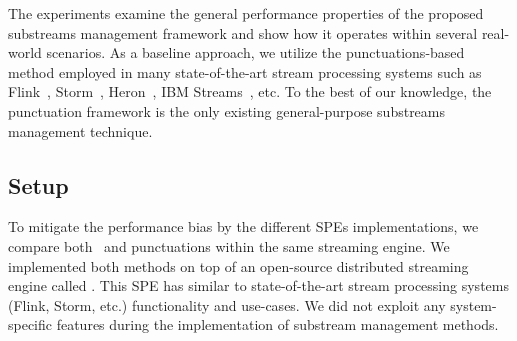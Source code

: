 
The experiments examine the general performance properties of the proposed substreams management framework and show how it operates within several real-world scenarios. As a baseline approach, we utilize the punctuations-based method employed in many state-of-the-art stream processing systems such as Flink~\cite{Carbone:2017:SMA:3137765.3137777}, Storm~\cite{apache:storm:state}, Heron~\cite{Kulkarni:2015:THS:2723372.2742788}, IBM Streams~\cite{jacques2016consistent}, etc. To the best of our knowledge, the punctuation framework is the only existing general-purpose substreams management technique.

\subsection{Setup}

To mitigate the performance bias by the different SPEs implementations, we compare both \tracker\ and punctuations within the same streaming engine. We implemented both methods on top of an open-source distributed streaming engine called \FlameStream. This SPE has similar to state-of-the-art stream processing systems (Flink, Storm, etc.) functionality and use-cases. We did not exploit any system-specific features during the implementation of substream management methods.

